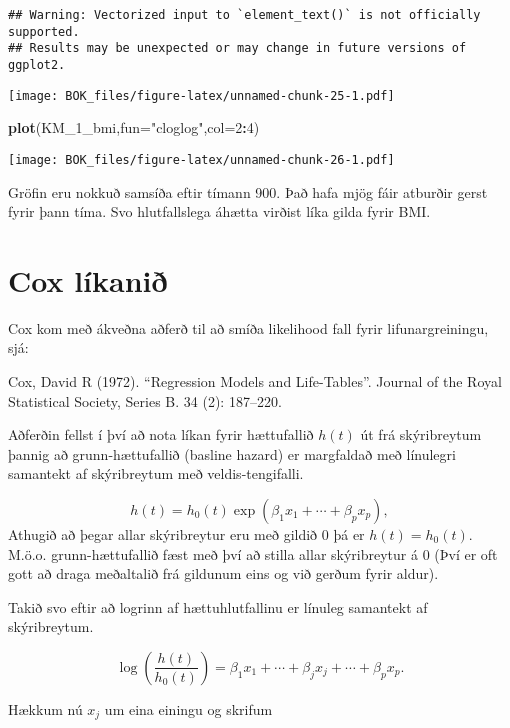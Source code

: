 \documentclass[
]{book}
\newenvironment{Shaded}{\begin{snugshade}}{\end{snugshade}}
\newcommand{\DataTypeTok}[1]{\textcolor[rgb]{0.13,0.29,0.53}{#1}}
\newcommand{\DecValTok}[1]{\textcolor[rgb]{0.00,0.00,0.81}{#1}}
\newcommand{\KeywordTok}[1]{\textcolor[rgb]{0.13,0.29,0.53}{\textbf{#1}}}
\newcommand{\NormalTok}[1]{#1}
\newcommand{\OperatorTok}[1]{\textcolor[rgb]{0.81,0.36,0.00}{\textbf{#1}}}
\newcommand{\StringTok}[1]{\textcolor[rgb]{0.31,0.60,0.02}{#1}}
\begin{document}
\begin{verbatim}
## Warning: Vectorized input to `element_text()` is not officially supported.
## Results may be unexpected or may change in future versions of ggplot2.
\end{verbatim}

\texttt{[image: BOK\_files/figure-latex/unnamed-chunk-25-1.pdf]}

\begin{Shaded}
\begin{Highlighting}[]
\KeywordTok{plot}\NormalTok{(KM\_}\DecValTok{1}\NormalTok{\_bmi,}\DataTypeTok{fun=}\StringTok{"cloglog"}\NormalTok{,}\DataTypeTok{col=}\DecValTok{2}\OperatorTok{:}\DecValTok{4}\NormalTok{)}
\end{Highlighting}
\end{Shaded}

\texttt{[image: BOK\_files/figure-latex/unnamed-chunk-26-1.pdf]}

Gröfin eru nokkuð samsíða eftir tímann 900. Það hafa mjög fáir atburðir gerst fyrir þann tíma. Svo hlutfallslega áhætta virðist líka gilda fyrir BMI.

\hypertarget{cox}{%
\section{Cox líkanið}\label{cox}}

Cox kom með ákveðna aðferð til að smíða likelihood fall fyrir lifunargreiningu, sjá:

Cox, David R (1972). ``Regression Models and Life-Tables''. Journal of the Royal Statistical Society, Series B. 34 (2): 187--220.

Aðferðin fellst í því að nota líkan fyrir hættufallið \(h(t)\) út frá skýribreytum þannig að grunn-hættufallið (basline hazard) er margfaldað með línulegri samantekt af skýribreytum með veldis-tengifalli.

\[
h(t) = h_0(t) \exp(\beta_1 x_1 + \cdots + \beta_p x_p),
\]
Athugið að þegar allar skýribreytur eru með gildið 0 þá er \(h(t) = h_0(t)\). M.ö.o. grunn-hættufallið fæst með því að stilla allar skýribreytur á 0 (Því er oft gott að draga meðaltalið frá gildunum eins og við gerðum fyrir aldur).

Takið svo eftir að logrinn af hættuhlutfallinu er línuleg samantekt af skýribreytum.

\[
\log \left( \frac{h(t)}{h_0(t)} \right) = \beta_1 x_1 + \cdots + \beta_j x_j + \cdots + \beta_p x_p.
\]

Hækkum nú \(x_j\) um eina einingu og skrifum
\end{document}
